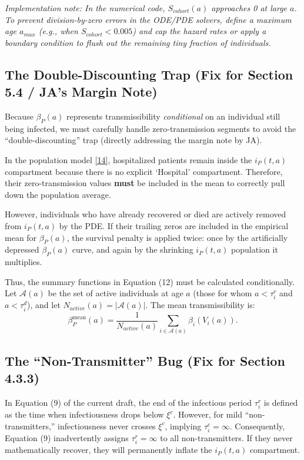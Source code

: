 \documentclass[11pt]{article}
\begin{document}
\emph{Implementation note: In the numerical code, $S_{cohort}(a)$ approaches 0 at large $a$. To prevent division-by-zero errors in the ODE/PDE solvers, define a maximum age $a_{max}$ (e.g., when $S_{cohort} < 0.005$) and cap the hazard rates or apply a boundary condition to flush out the remaining tiny fraction of individuals.}

\subsection{The Double-Discounting Trap (Fix for Section 5.4 / JA's Margin Note)}

Because $\beta_P(a)$ represents transmissibility \emph{conditional} on an individual still being infected, we must carefully handle zero-transmission segments to avoid the ``double-discounting'' trap (directly addressing the margin note by JA).

In the population model \eqref{14}, hospitalized patients remain inside the $i_P(t,a)$ compartment because there is no explicit `Hospital' compartment. Therefore, their zero-transmission values \textbf{must} be included in the mean to correctly pull down the population average. 

However, individuals who have already recovered or died are actively removed from $i_P(t,a)$ by the PDE. If their trailing zeros are included in the empirical mean for $\beta_P(a)$, the survival penalty is applied twice: once by the artificially depressed $\beta_P(a)$ curve, and again by the shrinking $i_P(t,a)$ population it multiplies.

Thus, the summary functions in Equation (12) must be calculated conditionally. Let $\mathcal{A}(a)$ be the set of active individuals at age $a$ (those for whom $a < \tau_i^r$ and $a < \tau_i^d$), and let $N_{active}(a) = |\mathcal{A}(a)|$. The mean transmissibility is:
\begin{equation}
    \beta_P^{\text{mean}}(a) = \frac{1}{N_{active}(a)} \sum_{i \in \mathcal{A}(a)} \beta_i(V_i(a)).
\end{equation}

\subsection{The ``Non-Transmitter'' Bug (Fix for Section 4.3.3)}

In Equation (9) of the current draft, the end of the infectious period $\tau_i^r$ is defined as the time when infectiousness drops below $\xi^c$. However, for mild ``non-transmitters,'' infectiousness never crosses $\xi^c$, implying $\tau_i^c = \infty$. Consequently, Equation (9) inadvertently assigns $\tau_i^r = \infty$ to all non-transmitters. If they never mathematically recover, they will permanently inflate the $i_P(t,a)$ compartment. 
\end{document}
